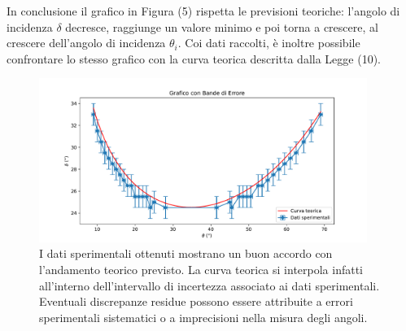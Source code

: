 In conclusione il grafico in Figura (5) rispetta le previsioni teoriche: l'angolo di incidenza $\delta$ decresce, raggiunge un valore minimo e poi torna a crescere, al crescere dell'angolo di incidenza $\theta_i$. Coi dati raccolti, è inoltre possibile confrontare lo stesso grafico con la curva teorica descritta dalla Legge (10).

\begin{figure}[H]
	\centering
	\includegraphics[width=0.95\textwidth]{./figures/grafico2.pdf}
	\captionsetup{width=0.7\linewidth}
	\caption{I dati sperimentali ottenuti mostrano un buon accordo con l'andamento teorico previsto. La curva teorica si interpola infatti all'interno dell'intervallo di incertezza associato ai dati sperimentali. Eventuali discrepanze residue possono essere attribuite a errori sperimentali sistematici o a imprecisioni nella misura degli angoli.}
\end{figure}